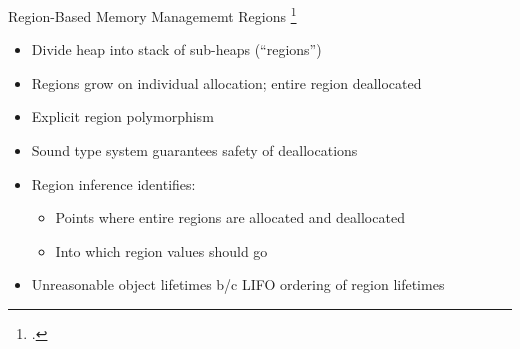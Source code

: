 \documentclass[aspectratio=169]{beamer}
\begin{document}

\begin{frame}{Region-Based Memory Managememt}
    Regions \footcite{tofte_region-based_1997}
    \begin{itemize}[<+->]
        \item Divide heap into stack of sub-heaps (``regions'') 
        \item Regions grow on individual allocation; \alert{entire} region deallocated 
        \item Explicit region polymorphism 
        \item Sound type system \alert{guarantees safety} of deallocations 
        \item Region inference identifies:
            \begin{itemize}
                \item Points where entire regions are allocated and deallocated
                \item Into which region values should go
            \end{itemize}
        \item Unreasonable object lifetimes b/c LIFO ordering of region lifetimes %
    \end{itemize}
    \vspace{0.1in}
\end{frame}
\end{document}
